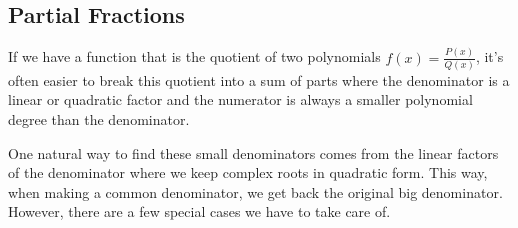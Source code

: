 \subsection{Partial Fractions}

If we have a function that is the quotient of two polynomials $f(x) = \frac{P(x)}{Q(x)}$, it's often easier to break this quotient into a sum of parts where the denominator is a linear or quadratic factor and the numerator is always a smaller polynomial degree than the denominator.




One natural way to find these small denominators comes from the linear factors of the denominator where we keep complex roots in quadratic form.
This way, when making a common denominator, we get back the original big denominator.
However, there are a few special cases we have to take care of.






